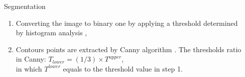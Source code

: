 \documentclass{LaBRI_poster}
\begin{document}
\begin{frame}[t]
\begin{columns}[t]
  		
	



\begin{column}{\sepwidth}\end{column} %

\end{columns}


\begin{columns}[t]

\begin{column}{\sepwidth}\end{column} %


\begin{column}{\twocolwidth}

\begin{block}{Segmentation}
	
	\begin{enumerate}[\hspace{25pt}1.]
		\item Converting the image to binary one by applying a threshold determined by histogram analysis \cite{leestimating},
		\item Contours points are extracted by Canny algorithm \cite{canny1986computational}. The thresholds ratio in Canny: $T_{lower} = (1/3) \times T^{upper}$,\\ in which $T^{lower}$ equals to the threshold value in step 1.
	\end{enumerate}
	
\end{block}




\end{column}
\end{columns}
\end{frame}
\end{document}
